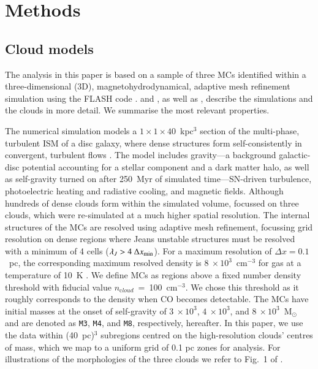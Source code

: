 \documentclass{aa}		%
\begin{document}
\section{Methods}\label{methods}


\subsection{Cloud models}\label{methods:clouds}

The analysis in this paper is based on a sample of three MCs identified within a three-dimensional (3D), magnetohydrodynamical, adaptive mesh refinement simulation using the FLASH code \citep{Fryxell2000}.  
 and , as well as \citet[ hereafter]{Chira2018}, describe the simulations and the clouds in more detail. 
We summarise the most relevant properties. 

The numerical simulation models a $1\times1\times40$~kpc$^3$ section of the multi-phase, turbulent ISM of a disc galaxy, where dense structures form self-consistently in convergent, turbulent flows .  
The model includes gravity---a background galactic-disc potential accounting for a stellar component and a dark matter halo, as well as self-gravity turned on after 250~Myr of simulated time---SN-driven turbulence, photoelectric heating and radiative cooling, and magnetic fields. 
Although hundreds of dense clouds form within the simulated volume,  focussed on three clouds, which were re-simulated at a much higher spatial resolution.
The internal structures of the MCs are resolved using adaptive mesh refinement, focussing grid resolution on dense regions where Jeans unstable structures must be resolved with a minimum of 4 cells ($\lambda_J > 4~\Delta x_{\rm min}$).
For a maximum resolution of $\Delta x = 0.1$~pc, the corresponding maximum resolved density is $8~\times 10^3$~cm$^{-3}$ for gas at a temperature of 10~K . 
We define MCs as regions above a fixed number density threshold with fiducial value $n_{\mathrm cloud}$~=~100~cm$^{-3}$.
We chose this threshold as it roughly corresponds to the density when CO becomes detectable.
The MCs have initial masses at the onset of self-gravity of $3~\times 10^3$, $4~\times 10^3$, and $8~\times 10^3$~M$_{\odot}$ and are denoted as \texttt{M3}, \texttt{M4}, and \texttt{M8}, respectively, hereafter. 
In this paper, we use the data within (40~pc)$^{3}$ subregions centred on the high-resolution clouds' centres of mass, which we map to a uniform grid of 0.1 pc zones for analysis.
For illustrations of the morphologies of the three clouds we refer to Fig.~1 of .
\end{document}
